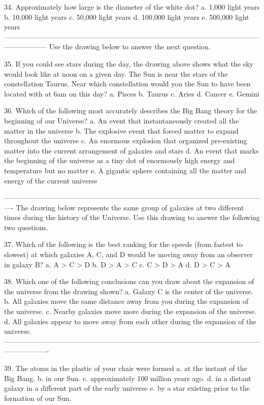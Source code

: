 34. Approximately how large is the diameter of the white dot?
a. 1,000 light years
b. 10,000 light years
c. 50,000 light years
d. 100,000 light years
e. 500,000 light years
------------------------------------------------------------------------------------------------------------------------------
Use the drawing below to answer the next question.

35. If you could see stars during the day, the drawing above shows what the sky would look like at noon on a given day. The Sun is near the stars of the constellation Taurus. Near which constellation would you the Sun to have been located with at 6am on this day?
a.  Pisces
b. Taurus
c. Aries 
d. Cancer 
e. Gemini

36. Which of the following most accurately describes the Big Bang theory for the beginning of our Universe?
a. An event that instantaneously created all the matter in the universe
b. The explosive event that forced matter to expand throughout the universe
c. An enormous explosion that organized pre-existing matter into the current arrangement of galaxies and stars
d. An event that marks the beginning of the universe as a tiny dot of enormously high energy and temperature but no matter
e. A gigantic sphere containing all the matter and energy of the current universe


----------------------------------------------------------------------------------------------------------------
The drawing below represents the same group of galaxies at two different times during the history of the Universe. Use this drawing to answer the following two questions.



37. Which of the following is the best ranking for the speeds (from fastest to slowest) at which galaxies A, C, and D would be moving away from an observer in galaxy B?
a. A > C > D
b. D > A > C
c. C > D > A
d. D > C > A

38. Which one of the following conclusions can you draw about the expansion of the universe from the drawing shown? 
a. Galaxy C is the center of the universe.
b. All galaxies move the same distance away from you during the expansion of the universe.
c. Nearby galaxies move more during the expansion of the universe.
d. All galaxies appear to move away from each other during the expansion of the universe.
-------------------------------------------------------------------------------------------------------------------------------


39. The atoms in the plastic of your chair were formed
a. at the instant of the Big Bang.
b. in our Sun. 
c. approximately 100 million years ago.
d. in a distant galaxy in a different part of the early universe
e. by a star existing prior to the formation of our Sun.


